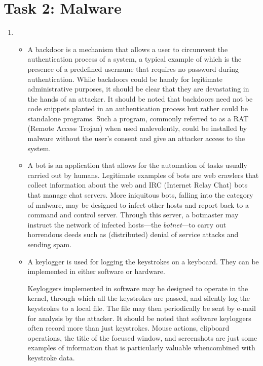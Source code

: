 \section*{Task 2: Malware}
\begin{enumerate}
\item %
  \begin{itemize}
  \item A backdoor is a mechanism that allows a user to circumvent the authentication process of a system, a typical example of which is the presence of a predefined username that requires no password during authentication. While backdoors could be handy for legitimate administrative purposes, it should be clear that they are devastating in the hands of an attacker. It should be noted that backdoors need not be code snippets planted in an authentication process but rather could be standalone programs. Such a program, commonly referred to as a RAT (Remote Access Trojan) when used malevolently, could be installed by malware without the user's consent and give an attacker access to the system.\cite{aycock06}
  \item
    A bot is an application that allows for the automation of tasks usually carried out by humans. Legitimate examples of bots are web crawlers that collect information about the web and IRC (Internet Relay Chat) bots that manage chat servers\cite{cisco_difference}. More iniquitous bots, falling into the category of malware, may be designed to infect other hosts and report back to a command and control server. Through this server, a botmaster may instruct the network of infected hosts---the \textit{botnet}---to carry out horrendous deeds such as (distributed) denial of service attacks and sending spam\cite{cisco_botnets}.
  \item
    A keylogger is used for logging the keystrokes on a keyboard. They can be implemented in either software or hardware.

Keyloggers implemented in software may be designed to operate in the kernel, through which all the keystrokes are passed, and silently log the keystrokes to a local file. The file may then periodically be sent by e-mail for analysis by the attacker\cite{wikipedia_keylogger}. It should be noted that software keyloggers often record more than just keystrokes. Mouse actions, clipboard operations, the title of the focused window, and screenshots are just some examples of information that is particularly valuable whencombined with keystroke data\cite{sagiroglu09}.


\end{itemize}
\end{enumerate}
